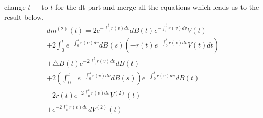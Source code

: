 \documentclass[10pt]{article}
\begin{document}
change $t-$ to $t$ for the dt part and merge all the equations which leads us to the result below.
\begin{equation}
\begin{split}
dm^{(2)}(t) = 2e^{-\int_0^t {r(v) dv}}dB(t)e^{-\int_0^t {r(v) dv}}V(t) \\
+ 2 \int_0^{t} e^{-\int_0^s r(v)dv} dB(s)(-r(t)e^{-\int_0^t r(v) dv}V(t) dt) \\
+ \triangle B(t) e^{-2\int_0^t {r(v) dv}}dB(t) \\
+ 2(\int_0^{t-} {e^{-\int_0^s {r(v) dv}}dB(s)})e^{-\int_0^t {r(v) dv}}dB(t) \\
-2r(t)e^{-2\int_0^t {r(v) dv}} V^{(2)}(t) \\
+ e^{-2\int_0^t {r(v) dv}} dV^{(2)}(t)
\end{split}
\end{equation}

\newpage
\end{document}
